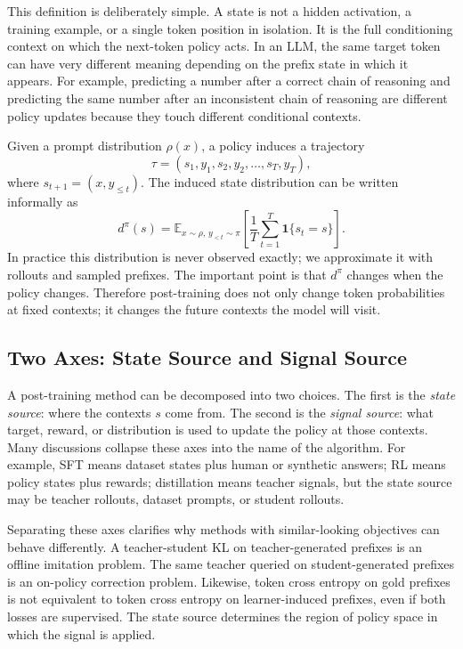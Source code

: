 \documentclass{article}
\begin{document}
This definition is deliberately simple. A state is not a hidden activation, a
training example, or a single token position in isolation. It is the full
conditioning context on which the next-token policy acts. In an LLM, the same
target token can have very different meaning depending on the prefix state in
which it appears. For example, predicting a number after a correct chain of
reasoning and predicting the same number after an inconsistent chain of
reasoning are different policy updates because they touch different conditional
contexts.

Given a prompt distribution $\rho(x)$, a policy induces a trajectory
\begin{equation}
    \tau = (s_1,y_1,s_2,y_2,\ldots,s_T,y_T),
\end{equation}
where $s_{t+1}=(x,y_{\leq t})$. The induced state distribution can be written
informally as
\begin{equation}
    d^\pi(s) =
    \mathbb{E}_{x\sim \rho,\, y_{<t}\sim \pi}
    \left[
    \frac{1}{T}\sum_{t=1}^{T}\mathbf{1}\{s_t=s\}
    \right].
\end{equation}
In practice this distribution is never observed exactly; we approximate it with
rollouts and sampled prefixes. The important point is that $d^\pi$ changes when
the policy changes. Therefore post-training does not only change token
probabilities at fixed contexts; it changes the future contexts the model will
visit.

\subsection{Two Axes: State Source and Signal Source}

A post-training method can be decomposed into two choices. The first is the
\emph{state source}: where the contexts $s$ come from. The second is the
\emph{signal source}: what target, reward, or distribution is used to update the
policy at those contexts. Many discussions collapse these axes into the name of
the algorithm. For example, SFT means dataset states plus human or synthetic
answers; RL means policy states plus rewards; distillation means teacher
signals, but the state source may be teacher rollouts, dataset prompts, or
student rollouts.

Separating these axes clarifies why methods with similar-looking objectives can
behave differently. A teacher-student KL on teacher-generated prefixes is an
offline imitation problem. The same teacher queried on student-generated
prefixes is an on-policy correction problem. Likewise, token cross entropy on
gold prefixes is not equivalent to token cross entropy on learner-induced
prefixes, even if both losses are supervised. The state source determines the
region of policy space in which the signal is applied.
\end{document}
